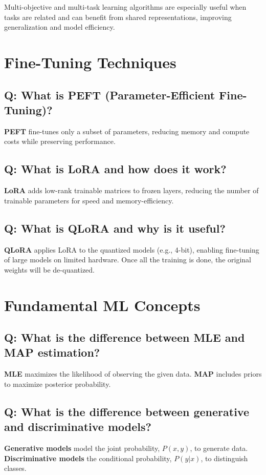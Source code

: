 \documentclass[11pt]{article}
\begin{document}
Multi-objective and multi-task learning algorithms are especially useful when tasks are related and can benefit from shared representations, improving generalization and model efficiency.


\section{Fine-Tuning Techniques}

\subsection*{Q: What is PEFT (Parameter-Efficient Fine-Tuning)?}
\textbf{PEFT} fine-tunes only a subset of parameters, reducing memory and compute costs while preserving performance.

\subsection*{Q: What is LoRA and how does it work?}
\textbf{LoRA} adds low-rank trainable matrices to frozen layers, reducing the number of trainable parameters for speed and memory-efficiency.

\subsection*{Q: What is QLoRA and why is it useful?}
\textbf{QLoRA} applies LoRA to the quantized models (e.g., 4-bit), enabling fine-tuning of large models on limited hardware. Once all the training is done, the original weights will be de-quantized.

\section{Fundamental ML Concepts}

\subsection*{Q: What is the difference between MLE and MAP estimation?}
\textbf{MLE} maximizes the likelihood of observing the given data. \textbf{MAP} includes priors to maximize posterior probability.

\subsection*{Q: What is the difference between generative and discriminative models?}
\textbf{Generative models} model the joint probability, \(P(x, y)\), to generate data. \textbf{Discriminative models} the conditional probability, \(P(y|x)\), to distinguish classes.
\end{document}
